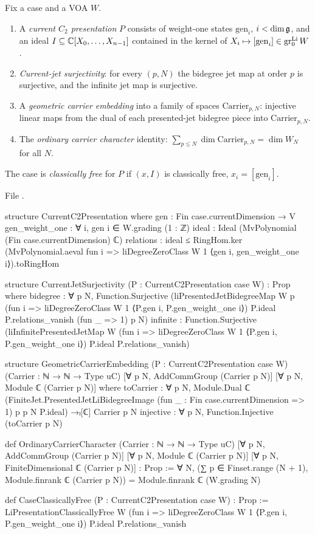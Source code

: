 \begin{definition}\label{l24:def:packages}
Fix a case and a VOA $W$.
\begin{enumerate}
\item A \emph{current $C_2$ presentation} $P$ consists of weight-one states $\mathrm{gen}_i$,
  $i<\dim\mathfrak g$, and an ideal $I\subseteq{\mathbb{C}}[X_0,\dots,X_{n-1}]$ contained in the kernel of
  $X_i\mapsto[\mathrm{gen}_i]\in\operatorname{gr}^{\mathrm{Li}}_0W$.
\item \emph{Current-jet surjectivity}: for every $(p,N)$ the bidegree jet map at order $p$ is surjective,
  and the infinite jet map is surjective.
\item A \emph{geometric carrier embedding} into a family of spaces $\mathrm{Carrier}_{p,N}$: injective linear
  maps from the dual of each presented-jet bidegree piece into $\mathrm{Carrier}_{p,N}$.
\item The \emph{ordinary carrier character} identity: $\sum_{p\le N}\dim\mathrm{Carrier}_{p,N}=\dim W_N$ for all $N$.
\end{enumerate}
The case is \emph{classically free} for $P$ if $(x,I)$ is classically free, $x_i=[\mathrm{gen}_i]$.
\end{definition}
\noindent File .
\begin{leancode}
structure CurrentC2Presentation where
  gen : Fin case.currentDimension → V
  gen_weight_one : ∀ i, gen i ∈ W.grading (1 : ℤ)
  ideal : Ideal (MvPolynomial (Fin case.currentDimension) ℂ)
  relations : ideal ≤ RingHom.ker
      (MvPolynomial.aeval fun i =>
        liDegreeZeroClass W 1 ⟨gen i, gen_weight_one i⟩).toRingHom

structure CurrentJetSurjectivity (P : CurrentC2Presentation case W) : Prop where
  bidegree : ∀ p N, Function.Surjective
    (liPresentedJetBidegreeMap W p
      (fun i => liDegreeZeroClass W 1 ⟨P.gen i, P.gen_weight_one i⟩)
      P.ideal P.relations_vanish (fun _ => 1) p N)
  infinite : Function.Surjective
    (liInfinitePresentedJetMap W
      (fun i => liDegreeZeroClass W 1 ⟨P.gen i, P.gen_weight_one i⟩)
      P.ideal P.relations_vanish)

structure GeometricCarrierEmbedding
    (P : CurrentC2Presentation case W)
    (Carrier : ℕ → ℕ → Type uC)
    [∀ p N, AddCommGroup (Carrier p N)]
    [∀ p N, Module ℂ (Carrier p N)] where
  toCarrier : ∀ p N,
    Module.Dual ℂ
      (FiniteJet.PresentedJetLiBidegreeImage
        (fun _ : Fin case.currentDimension => 1) p p N P.ideal) →ₗ[ℂ]
      Carrier p N
  injective : ∀ p N, Function.Injective (toCarrier p N)

def OrdinaryCarrierCharacter
    (Carrier : ℕ → ℕ → Type uC)
    [∀ p N, AddCommGroup (Carrier p N)]
    [∀ p N, Module ℂ (Carrier p N)]
    [∀ p N, FiniteDimensional ℂ (Carrier p N)] : Prop :=
  ∀ N,
    (∑ p ∈ Finset.range (N + 1), Module.finrank ℂ (Carrier p N)) =
      Module.finrank ℂ (W.grading N)

def CaseClassicallyFree (P : CurrentC2Presentation case W) : Prop :=
  LiPresentationClassicallyFree W
    (fun i => liDegreeZeroClass W 1 ⟨P.gen i, P.gen_weight_one i⟩)
    P.ideal P.relations_vanish
\end{leancode}

